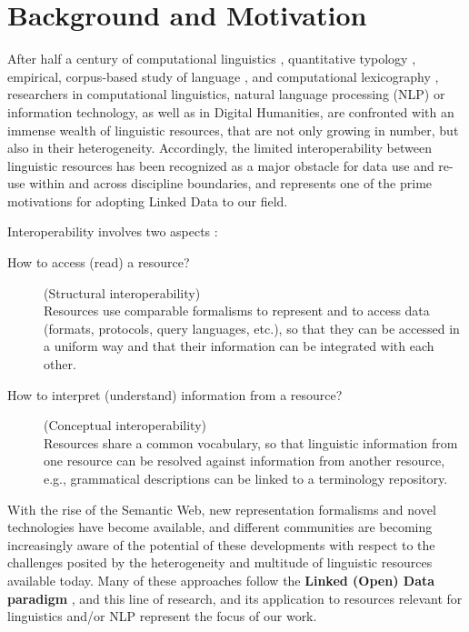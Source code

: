 \section{Background and Motivation}
\label{sec-background}

After
half a century of computational linguistics \citep{dostert1955georgetown},               %
quantitative typology \citep{greenberg60-quant},
empirical, corpus-based study of language \citep{francis-kucera1964},  and %
computational lexicography \citep{morris1969},
researchers in computational linguistics, natural language processing (NLP) or information technology, as well as in Digital Humanities,
 are confronted with an immense wealth of linguistic resources, that are not only growing in number, but also in their heterogeneity.
Accordingly, the limited interoperability between linguistic resources has been recognized as a major obstacle for data use and 
re-use within and across discipline boundaries, and represents one of the prime motivations for adopting Linked Data to our field. 
 
Interoperability involves two aspects \citep{ide-pustejovsky2010-interoperability}:

\begin{description}
\item[How to access (read) a resource?] (Structural interoperability)\\
Resources use comparable formalisms to represent and to access data (formats, protocols, query languages, etc.), so that they can be accessed in a uniform way and that their information can be integrated with each other.
\item[How to interpret (understand) information from a resource?] ({Conceptual} interoperability)\\
Resources share a common vocabulary, so that linguistic information from one resource can be resolved against information from another resource, e.g., grammatical descriptions can be linked to a terminology repository.
\end{description}

\noindent With the rise of the Semantic Web, new representation formalisms and novel technologies have become available, and different communities are becoming increasingly aware of the potential of these developments with respect to the challenges posited by the heterogeneity and multitude of linguistic resources available today. Many of these approaches follow the \textbf{Linked (Open) Data paradigm} \citep{bernersLee2006_linkeddata}, and this line of research, and its application to resources relevant for linguistics and/or NLP represent the focus of our work.

